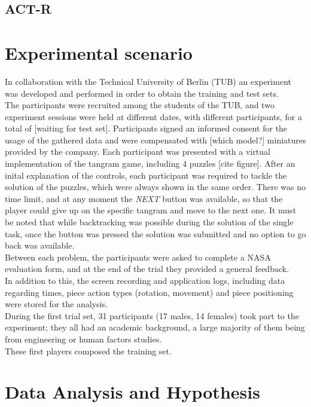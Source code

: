 \documentclass[a4paper,singleside,12pt]{report} %
\begin{document}
	\section{ACT-R}

    
	
	\chapter{Experimental scenario}
    In collaboration with the Technical University of Berlin (TUB) an experiment was developed and
    performed in order to obtain the training and test sets.\\
	The participants were recruited among the students of the TUB, and two experiment sessions were
	held at different dates, with different participants, for a total of [waiting for test set].
	Participants signed an informed consent for the usage of the gathered data and were compensated
	with [which model?] miniatures provided by the company. Each participant was presented with a
	virtual implementation of the tangram game, including 4 puzzles [cite figure]. After an inital
	explanation of the controls, each participant was required to tackle the solution of the
	puzzles, which were always shown in the same order. There was no time limit, and at any moment
	the \textit{NEXT} button was available, so that the player could give up on the specific tangram
	and move to the next one. It must be noted that while backtracking was possible during the
	solution of the single task, once the button was pressed the solution was submitted and no
	option to go back was available.\\
	Between each problem, the participants were asked to complete a NASA evaluation form, and at the
	end of the trial they provided a general feedback. \\
	In addition to this, the screen recording and application logs, including data regarding times,
	piece action types (rotation, movement) and piece positioning were stored for the analysis. \\
	During the first trial set, 31 participants (17 males, 14 females) took part to the experiment;
	they all had an academic background, a large majority of them being from engineering or human
	factors studies. \\
	These first players composed the training set.
    
	
	\chapter{Data Analysis and Hypothesis}
    
\end{document}
